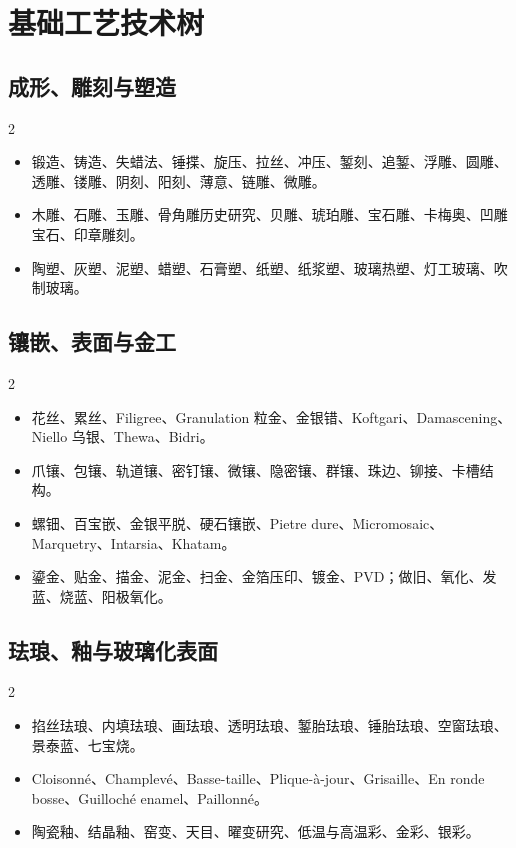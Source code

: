 \documentclass[lang=en,a4paper,11pt]{elegantpaper}
\begin{document}
\section{基础工艺技术树}


\subsection{成形、雕刻与塑造}


\begin{multicols}{2}
\begin{itemize}
\item 锻造、铸造、失蜡法、锤揲、旋压、拉丝、冲压、錾刻、追錾、浮雕、圆雕、透雕、镂雕、阴刻、阳刻、薄意、链雕、微雕。
\item 木雕、石雕、玉雕、骨角雕历史研究、贝雕、琥珀雕、宝石雕、卡梅奥、凹雕宝石、印章雕刻。
\item 陶塑、灰塑、泥塑、蜡塑、石膏塑、纸塑、纸浆塑、玻璃热塑、灯工玻璃、吹制玻璃。
\end{itemize}
\end{multicols}

\subsection{镶嵌、表面与金工}


\begin{multicols}{2}
\begin{itemize}
\item 花丝、累丝、Filigree、Granulation 粒金、金银错、Koftgari、Damascening、Niello 乌银、Thewa、Bidri。
\item 爪镶、包镶、轨道镶、密钉镶、微镶、隐密镶、群镶、珠边、铆接、卡槽结构。
\item 螺钿、百宝嵌、金银平脱、硬石镶嵌、Pietre dure、Micromosaic、Marquetry、Intarsia、Khatam。
\item 鎏金、贴金、描金、泥金、扫金、金箔压印、镀金、PVD；做旧、氧化、发蓝、烧蓝、阳极氧化。
\end{itemize}
\end{multicols}

\subsection{珐琅、釉与玻璃化表面}


\begin{multicols}{2}
\begin{itemize}
\item 掐丝珐琅、内填珐琅、画珐琅、透明珐琅、錾胎珐琅、锤胎珐琅、空窗珐琅、景泰蓝、七宝烧。
\item Cloisonné、Champlevé、Basse-taille、Plique-à-jour、Grisaille、En ronde bosse、Guilloché enamel、Paillonné。
\item 陶瓷釉、结晶釉、窑变、天目、曜变研究、低温与高温彩、金彩、银彩。
\end{itemize}
\end{multicols}
\end{document}

